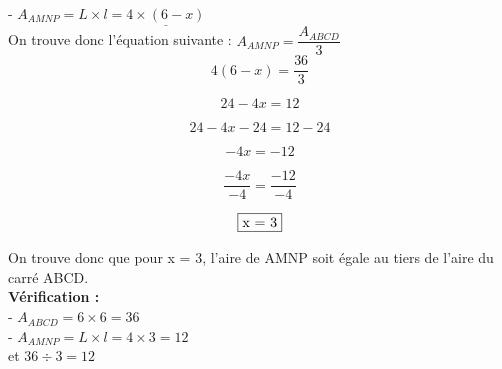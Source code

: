 \documentclass[a4paper,11pt]{article}
\begin{document}
- $A_{AMNP} = L \times l = \underline{4 \times (6-x)}$\\

On trouve donc l'équation suivante : \hspace*{1cm} $A_{AMNP} = \dfrac{A_{ABCD}}{3}$\\

$$4(6-x)=\dfrac{36}{3} $$

$$24-4x=12 $$

$$24-4x -24=12-24 $$

$$-4x = -12 $$

$$\dfrac{-4x}{-4}= \dfrac{-12}{-4} $$

$$ \fbox{x = 3} $$


On trouve donc que pour x = 3, l'aire de AMNP soit égale au tiers de l'aire du carré ABCD.\\


\textbf{Vérification :} \\
- $A_{ABCD} = 6 \times 6 = 36$ \\

- $A_{AMNP} = L \times l = 4 \times 3 = 12$\\

et $36 \div 3 = 12$\\

\color{black}
\vspace*{0.5cm}
\end{document}

